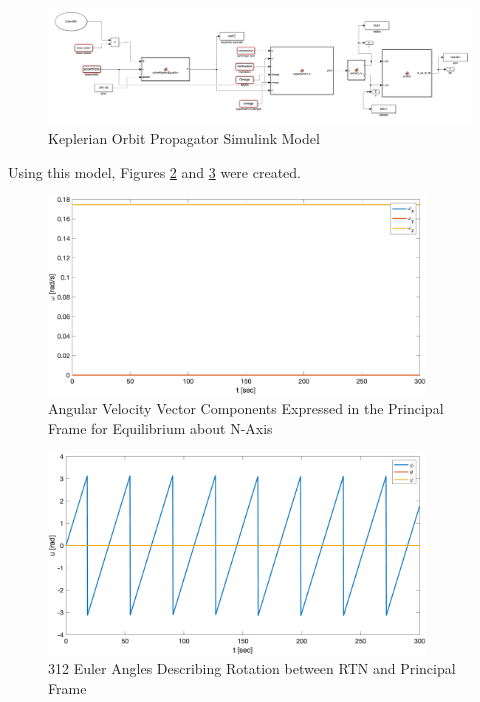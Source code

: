 \begin{figure}[H]
    \centering
    \captionsetup{ justification = centering}
    \includegraphics[width = 15cm]{Images/PS4/orbital_prop_simulink_kep.png}
    \caption{Keplerian Orbit Propagator Simulink Model}
    \label{fig:orb_prop_simulink_kep}
\end{figure}

Using this model, Figures \ref{fig:RTN_equilibrium_velocities} and \ref{fig:RTN_equilibrium_angles} were created.


\begin{figure}[H]
    \centering
    \captionsetup{ justification = centering}
    \includegraphics[width = 10cm]{Images/PS4/equilibrium_RTN_velocities.png}
    \caption{Angular Velocity Vector Components Expressed in the Principal Frame for Equilibrium about N-Axis}
    \label{fig:RTN_equilibrium_velocities}
\end{figure}

\begin{figure}[H]
    \centering
    \captionsetup{justification = centering}
    \includegraphics[width = 10cm]{Images/PS4/equilibrium_RTN_angles.png}
    \caption{312 Euler Angles Describing Rotation between RTN and Principal Frame}
    \label{fig:RTN_equilibrium_angles}
\end{figure}

